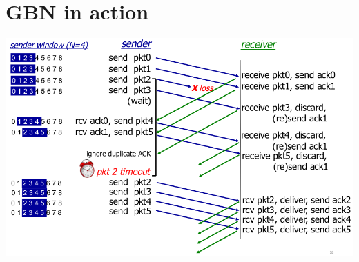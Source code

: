 \documentclass{article}[18pt]
\begin{document}
\section{GBN in action}
\begin{center}
	\includegraphics[scale=0.7]{GBN}
\end{center}
\end{document}
